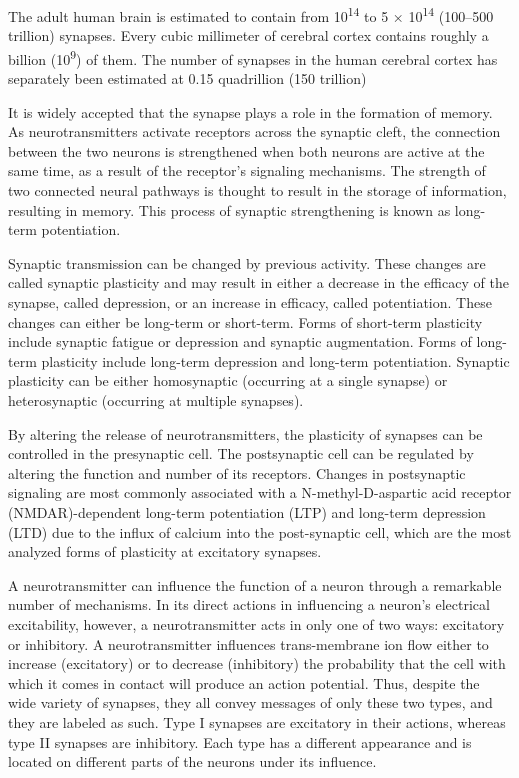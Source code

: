 The adult human brain is estimated to contain from 10\textsuperscript{14} to 5 × 10\textsuperscript{14} (100--500 trillion) synapses. Every cubic millimeter of cerebral cortex contains roughly a billion (10\textsuperscript{9}) of them. The number of synapses in the human cerebral cortex has separately been estimated at 0.15 quadrillion (150 trillion)

It is widely accepted that the synapse plays a role in the formation of memory. As neurotransmitters activate receptors across the synaptic cleft, the connection between the two neurons is strengthened when both neurons are active at the same time, as a result of the receptor's signaling mechanisms. The strength of two connected neural pathways is thought to result in the storage of information, resulting in memory. This process of synaptic strengthening is known as long-term potentiation.

Synaptic transmission can be changed by previous activity. These changes are called synaptic plasticity and may result in either a decrease in the efficacy of the synapse, called depression, or an increase in efficacy, called potentiation. These changes can either be long-term or short-term. Forms of short-term plasticity include synaptic fatigue or depression and synaptic augmentation. Forms of long-term plasticity include long-term depression and long-term potentiation. Synaptic plasticity can be either homosynaptic (occurring at a single synapse) or heterosynaptic (occurring at multiple synapses).

By altering the release of neurotransmitters, the plasticity of synapses can be controlled in the presynaptic cell. The postsynaptic cell can be regulated by altering the function and number of its receptors. Changes in postsynaptic signaling are most commonly associated with a N-methyl-D-aspartic acid receptor (NMDAR)-dependent long-term potentiation (LTP) and long-term depression (LTD) due to the influx of calcium into the post-synaptic cell, which are the most analyzed forms of plasticity at excitatory synapses.

A neurotransmitter can influence the function of a neuron through a remarkable number of mechanisms. In its direct actions in influencing a neuron's electrical excitability, however, a neurotransmitter acts in only one of two ways: excitatory or inhibitory. A neurotransmitter influences trans-membrane ion flow either to increase (excitatory) or to decrease (inhibitory) the probability that the cell with which it comes in contact will produce an action potential. Thus, despite the wide variety of synapses, they all convey messages of only these two types, and they are labeled as such. Type I synapses are excitatory in their actions, whereas type II synapses are inhibitory. Each type has a different appearance and is located on different parts of the neurons under its influence.

